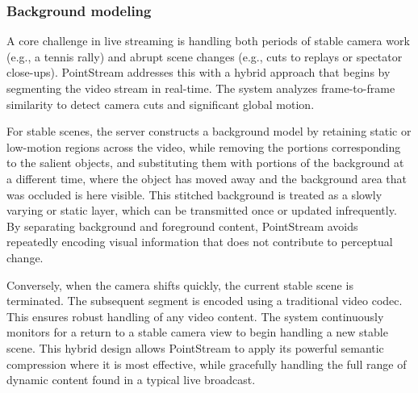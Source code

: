 \documentclass[manuscript, screen]{acmart}
\begin{document}
\subsubsection*{Background modeling}
A core challenge in live streaming is handling both periods of stable camera work (e.g., a tennis rally) and abrupt scene changes (e.g., cuts to replays or spectator close-ups). PointStream addresses this with a hybrid approach that begins by segmenting the video stream in real-time. The system analyzes frame-to-frame similarity to detect camera cuts and significant global motion.

For stable scenes, the server constructs a background model by retaining static or low-motion regions across the video, while removing the portions corresponding to the salient objects, and substituting them with portions of the background at a different time, where the object has moved away and the background area that was occluded is here visible.
This stitched background is treated as a slowly varying or static layer, which can be transmitted once or updated infrequently.
By separating background and foreground content, PointStream avoids repeatedly encoding visual information that does not contribute to perceptual change.

Conversely, when the camera shifts quickly, the current stable scene is terminated. The subsequent segment is encoded using a traditional video codec. This ensures robust handling of any video content. The system continuously monitors for a return to a stable camera view to begin handling a new stable scene. This hybrid design allows PointStream to apply its powerful semantic compression where it is most effective, while gracefully handling the full range of dynamic content found in a typical live broadcast.
\end{document}
